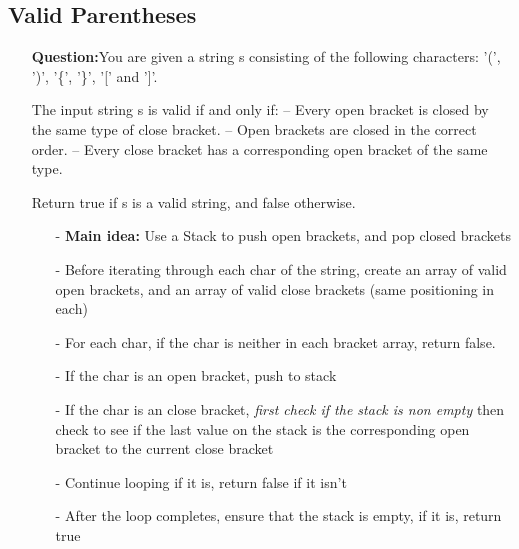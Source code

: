 \documentclass[12pt]{article}
\begin{document}
\subsection{Valid Parentheses}
\begin{enumerate}
  \item[] \textbf{Question:}You are given a string s consisting of the following characters: '(', ')', '\{', '\}', '[' and ']'.

The input string s is valid if and only if:
 -- Every open bracket is closed by the same type of close bracket.
 -- Open brackets are closed in the correct order.
 -- Every close bracket has a corresponding open bracket of the same type.

Return true if s is a valid string, and false otherwise.

    \begin{enumerate}
      \item[-] \textbf{Main idea:} Use a Stack to push open brackets, and pop closed brackets
      \item[-] Before iterating through each char of the string, create an array of valid open brackets, and an array of valid close brackets (same positioning in each) 
      \item[-] For each char, if the char is neither in each bracket array, return false. 
      \item[-] If the char is an open bracket, push to stack 
      \item[-] If the char is an close bracket, \textit{first check if the stack is non empty} then check to see if the last value on the stack is the corresponding open bracket to the current close bracket
      \item[-] Continue looping if it is, return false if it isn't
      \item[-] After the loop completes, ensure that the stack is empty, if it is, return true

    \end{enumerate}
\end{enumerate}
\end{document}
